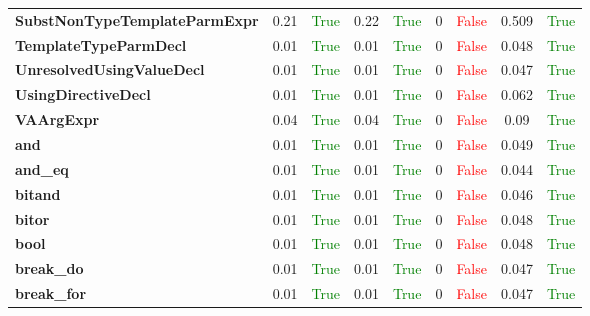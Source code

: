 \documentclass{article}
\begin{document}
\begin{xltabular}{\textwidth}{lcccccccc}
\textbf{{\fontsize{10}{12}\selectfont SubstNonTypeTemplateParmExpr}}& 0.21&\textcolor{green}{True}& 0.22&\textcolor{green}{True}& 0&\textcolor{red}{False}& 0.509&\textcolor{green}{True} \\[0.5ex]
\textbf{{\fontsize{10}{12}\selectfont TemplateTypeParmDecl}}& 0.01&\textcolor{green}{True}& 0.01&\textcolor{green}{True}& 0&\textcolor{red}{False}& 0.048&\textcolor{green}{True} \\[0.5ex]
\textbf{{\fontsize{10}{12}\selectfont UnresolvedUsingValueDecl}}& 0.01&\textcolor{green}{True}& 0.01&\textcolor{green}{True}& 0&\textcolor{red}{False}& 0.047&\textcolor{green}{True} \\[0.5ex]
\textbf{{\fontsize{10}{12}\selectfont UsingDirectiveDecl}}& 0.01&\textcolor{green}{True}& 0.01&\textcolor{green}{True}& 0&\textcolor{red}{False}& 0.062&\textcolor{green}{True} \\[0.5ex]
\textbf{{\fontsize{10}{12}\selectfont VAArgExpr}}& 0.04&\textcolor{green}{True}& 0.04&\textcolor{green}{True}& 0&\textcolor{red}{False}& 0.09&\textcolor{green}{True} \\[0.5ex]
\textbf{{\fontsize{10}{12}\selectfont and}}& 0.01&\textcolor{green}{True}& 0.01&\textcolor{green}{True}& 0&\textcolor{red}{False}& 0.049&\textcolor{green}{True} \\[0.5ex]
\textbf{{\fontsize{10}{12}\selectfont and\_eq}}& 0.01&\textcolor{green}{True}& 0.01&\textcolor{green}{True}& 0&\textcolor{red}{False}& 0.044&\textcolor{green}{True} \\[0.5ex]
\textbf{{\fontsize{10}{12}\selectfont bitand}}& 0.01&\textcolor{green}{True}& 0.01&\textcolor{green}{True}& 0&\textcolor{red}{False}& 0.046&\textcolor{green}{True} \\[0.5ex]
\textbf{{\fontsize{10}{12}\selectfont bitor}}& 0.01&\textcolor{green}{True}& 0.01&\textcolor{green}{True}& 0&\textcolor{red}{False}& 0.048&\textcolor{green}{True} \\[0.5ex]
\textbf{{\fontsize{10}{12}\selectfont bool}}& 0.01&\textcolor{green}{True}& 0.01&\textcolor{green}{True}& 0&\textcolor{red}{False}& 0.048&\textcolor{green}{True} \\[0.5ex]
\textbf{{\fontsize{10}{12}\selectfont break\_do}}& 0.01&\textcolor{green}{True}& 0.01&\textcolor{green}{True}& 0&\textcolor{red}{False}& 0.047&\textcolor{green}{True} \\[0.5ex]
\textbf{{\fontsize{10}{12}\selectfont break\_for}}& 0.01&\textcolor{green}{True}& 0.01&\textcolor{green}{True}& 0&\textcolor{red}{False}& 0.047&\textcolor{green}{True} \\[0.5ex]

\end{xltabular}
\end{document}
